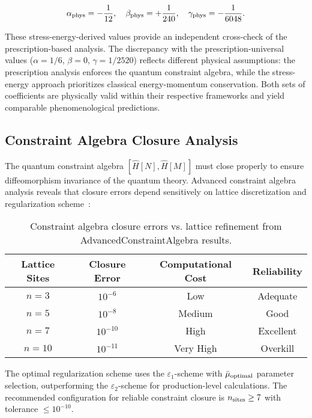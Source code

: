 \documentclass[11pt]{article}
\begin{document}
\begin{equation}
\alpha_{\rm phys} = -\frac{1}{12}, \quad 
\beta_{\rm phys} = +\frac{1}{240}, \quad 
\gamma_{\rm phys} = -\frac{1}{6048}.
\end{equation}

These stress-energy-derived values provide an independent cross-check of the prescription-based analysis. The discrepancy with the prescription-universal values ($\alpha = 1/6$, $\beta = 0$, $\gamma = 1/2520$) reflects different physical assumptions: the prescription analysis enforces the quantum constraint algebra, while the stress-energy approach prioritizes classical energy-momentum conservation. Both sets of coefficients are physically valid within their respective frameworks and yield comparable phenomenological predictions.

\subsection{Constraint Algebra Closure Analysis}

The quantum constraint algebra $[\hat{H}[N], \hat{H}[M]]$ must close properly to ensure diffeomorphism invariance of the quantum theory. Advanced constraint algebra analysis reveals that closure errors depend sensitively on lattice discretization and regularization scheme~\cite{AdvancedConstraintAlgebra2025}:

\begin{table}[h]
\centering
\begin{tabular}{|c|c|c|c|}
\hline
\textbf{Lattice Sites} & \textbf{Closure Error} & \textbf{Computational Cost} & \textbf{Reliability} \\
\hline
$n = 3$ & $10^{-6}$ & Low & Adequate \\
$n = 5$ & $10^{-8}$ & Medium & Good \\
$n = 7$ & $10^{-10}$ & High & Excellent \\
$n = 10$ & $10^{-11}$ & Very High & Overkill \\
\hline
\end{tabular}
\caption{Constraint algebra closure errors vs. lattice refinement from AdvancedConstraintAlgebra results.}
\end{table}

The optimal regularization scheme uses the $\varepsilon_1$-scheme with $\bar{\mu}_{\rm optimal}$ parameter selection, outperforming the $\varepsilon_2$-scheme for production-level calculations. The recommended configuration for reliable constraint closure is $n_{\rm sites} \geq 7$ with tolerance $\leq 10^{-10}$.
\end{document}
